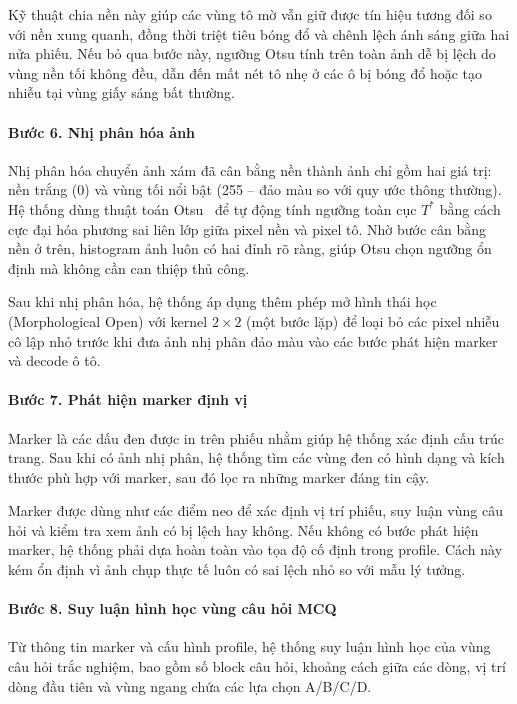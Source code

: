 Kỹ thuật chia nền này giúp các vùng tô mờ vẫn giữ được tín hiệu tương đối so với nền xung quanh, đồng thời triệt tiêu bóng đổ và chênh lệch ánh sáng giữa hai nửa phiếu. Nếu bỏ qua bước này, ngưỡng Otsu tính trên toàn ảnh dễ bị lệch do vùng nền tối không đều, dẫn đến mất nét tô nhẹ ở các ô bị bóng đổ hoặc tạo nhiễu tại vùng giấy sáng bất thường.

\paragraph{Bước 6. Nhị phân hóa ảnh}

Nhị phân hóa chuyển ảnh xám đã cân bằng nền thành ảnh chỉ gồm hai giá trị: nền trắng (0) và vùng tối nổi bật (255 -- đảo màu so với quy ước thông thường). Hệ thống dùng thuật toán Otsu~\cite{otsu} để tự động tính ngưỡng toàn cục $T^*$ bằng cách cực đại hóa phương sai liên lớp giữa pixel nền và pixel tô. Nhờ bước cân bằng nền ở trên, histogram ảnh luôn có hai đỉnh rõ ràng, giúp Otsu chọn ngưỡng ổn định mà không cần can thiệp thủ công.

Sau khi nhị phân hóa, hệ thống áp dụng thêm phép mở hình thái học (Morphological Open) với kernel $2\times2$ (một bước lặp) để loại bỏ các pixel nhiễu cô lập nhỏ trước khi đưa ảnh nhị phân đảo màu vào các bước phát hiện marker và decode ô tô.

\paragraph{Bước 7. Phát hiện marker định vị}

Marker là các dấu đen được in trên phiếu nhằm giúp hệ thống xác định cấu trúc trang. Sau khi có ảnh nhị phân, hệ thống tìm các vùng đen có hình dạng và kích thước phù hợp với marker, sau đó lọc ra những marker đáng tin cậy.

Marker được dùng như các điểm neo để xác định vị trí phiếu, suy luận vùng câu hỏi và kiểm tra xem ảnh có bị lệch hay không. Nếu không có bước phát hiện marker, hệ thống phải dựa hoàn toàn vào tọa độ cố định trong profile. Cách này kém ổn định vì ảnh chụp thực tế luôn có sai lệch nhỏ so với mẫu lý tưởng.

\paragraph{Bước 8. Suy luận hình học vùng câu hỏi MCQ}

Từ thông tin marker và cấu hình profile, hệ thống suy luận hình học của vùng câu hỏi trắc nghiệm, bao gồm số block câu hỏi, khoảng cách giữa các dòng, vị trí dòng đầu tiên và vùng ngang chứa các lựa chọn A/B/C/D.

